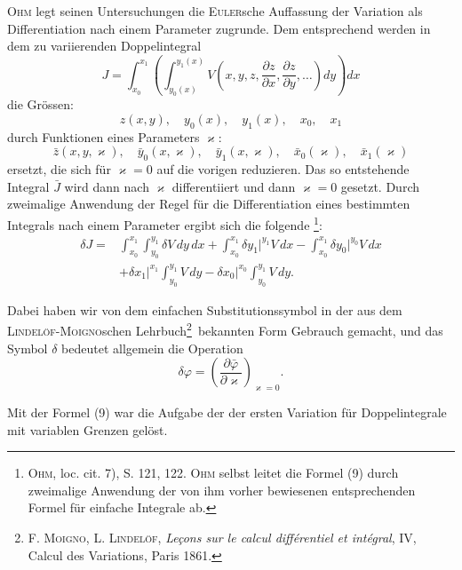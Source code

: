 \textsc{Ohm} legt seinen Untersuchungen die \textsc{Euler}sche Auffassung der Variation
als Differentiation nach einem Parameter zugrunde. Dem entsprechend werden
in dem zu variierenden Doppelintegral
\begin{equation*}
J=\int_{x_0}^{x_1}\left(\int_{y_0(x)}^{y_1(x)}V\left(x,y,z,\frac{\partial z}{\partial x},\frac{\partial z}{\partial y},\ldots\right)dy\right)dx\tag{8}
\end{equation*}
die Grössen:
\[
z(x,y),\quad y_0(x),\quad y_1(x),\quad x_0,\quad x_1
\]
durch Funktionen eines Parameters $\varkappa$:
\[
\bar z(x,y,\varkappa),\quad\bar y_0(x,\varkappa),\quad\bar y_1(x,\varkappa),\quad\bar x_0(\varkappa),\quad\bar x_1(\varkappa)
\]
ersetzt, die sich für $\varkappa=0$ auf die vorigen reduzieren. Das so entstehende
Integral $\bar J$ wird dann nach $\varkappa$ differentiiert und dann $\varkappa=0$ gesetzt. Durch
zweimalige Anwendung der Regel für die Differentiation eines bestimmten
Integrals nach einem Parameter ergibt sich die folgende \footnote{\textsc{Ohm}, loc. cit. 7), S. 121, 122. \textsc{Ohm} selbst leitet die Formel (9) durch zweimalige Anwendung der von ihm vorher bewiesenen entsprechenden Formel für einfache Integrale ab.}:
\begin{equation*}
\begin{aligned}
\delta J={}&\int_{x_0}^{x_1}\int_{y_0}^{y_1}\delta V\,dy\,dx
+\int_{x_0}^{x_1}\delta y_1\Big|^{y_1}V\,dx-\int_{x_0}^{x_1}\delta y_0\Big|^{y_0}V\,dx\\
&+\delta x_1\Big|^{x_1}\int_{y_0}^{y_1}V\,dy-\delta x_0\Big|^{x_0}\int_{y_0}^{y_1}V\,dy.
\end{aligned}\tag{9}
\end{equation*}

Dabei haben wir von dem einfachen Substitutionssymbol in der aus dem
\textsc{Lindelöf-Moigno}schen Lehrbuch\begingroup\renewcommand{\thefootnote}{8a)}\footnote{\textsc{F. Moigno, L. Lindelöf}, \textit{Leçons sur le calcul différentiel et intégral}, IV, Calcul des Variations, Paris 1861.}\endgroup\setcounter{footnote}{8}\ 
bekannten Form Gebrauch gemacht, und
das Symbol $\delta$ bedeutet allgemein die Operation
\[
\delta\varphi=\left(\frac{\partial\bar\varphi}{\partial\varkappa}\right)_{\varkappa=0}.
\]
\par\clearpage{}
\noindent Mit der Formel (9) war die Aufgabe der \textls[100]{Aufstellung} der ersten Variation
für Doppelintegrale mit variablen Grenzen gelöst.

